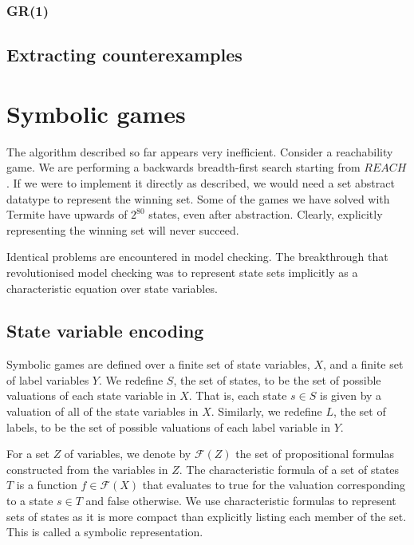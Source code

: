 \documentclass{book}
\newcommand{\forms}[0]{\mathcal{F}}
\theoremstyle{definition}
\begin{document}
\subsubsection{GR(1)}

\subsection{Extracting counterexamples}

\section{Symbolic games}

The algorithm described so far appears very inefficient. Consider a reachability game. We are performing a backwards breadth-first search starting from $REACH$. If we were to implement it directly as described, we would need a set abstract datatype to represent the winning set. Some of the games we have solved with Termite have upwards of $2^{80}$ states, even after abstraction. Clearly, explicitly representing the winning set will never succeed. 

Identical problems are encountered in model checking. The breakthrough that revolutionised model checking was to represent state sets implicitly as a characteristic equation over state variables.

\subsection{State variable encoding}

Symbolic games are defined over a finite set of state variables, $X$, and a finite set of label variables $Y$. We redefine $S$, the set of states, to be the set of possible valuations of each state variable in $X$. That is, each state $s \in S$ is given by a valuation of all of the state variables in $X$. Similarly, we redefine $L$, the set of labels, to be the set of possible valuations of each label variable in $Y$.

For a set $Z$ of variables, we denote by $\forms(Z)$ the set of propositional formulas constructed from the variables in $Z$. The characteristic formula of a set of states $T$ is a function $f \in \forms(X)$ that evaluates to true for the valuation corresponding to a state $s \in T$ and false otherwise. We use characteristic formulas to represent sets of states as it is more compact than explicitly listing each member of the set. This is called a symbolic representation.
\end{document}
